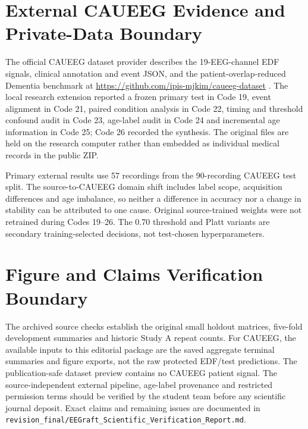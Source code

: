 \section{External CAUEEG Evidence and Private-Data Boundary}
The official CAUEEG dataset provider describes the 19-EEG-channel EDF signals, clinical annotation and event JSON, and the patient-overlap-reduced Dementia benchmark at \url{https://github.com/ipis-mjkim/caueeg-dataset} \cite{kim2023caueeg,caueegofficial}. The local research extension reported a frozen primary test in Code 19, event alignment in Code 21, paired condition analysis in Code 22, timing and threshold confound audit in Code 23, age-label audit in Code 24 and incremental age information in Code 25; Code 26 recorded the synthesis. The original files are held on the research computer rather than embedded as individual medical records in the public ZIP.

Primary external results use 57 recordings from the 90-recording CAUEEG test split. The source-to-CAUEEG domain shift includes label scope, acquisition differences and age imbalance, so neither a difference in accuracy nor a change in stability can be attributed to one cause. Original source-trained weights were not retrained during Codes 19--26. The 0.70 threshold and Platt variants are secondary training-selected decisions, not test-chosen hyperparameters.

\section{Figure and Claims Verification Boundary}
The archived source checks establish the original small holdout matrices, five-fold development summaries and historic Study A repeat counts. For CAUEEG, the available inputs to this editorial package are the saved aggregate terminal summaries and figure exports, not the raw protected EDF/test predictions. The publication-safe dataset preview contains no CAUEEG patient signal. The source-independent external pipeline, age-label provenance and restricted permission terms should be verified by the student team before any scientific journal deposit. Exact claims and remaining issues are documented in \texttt{revision\_final/}\mbox{\texttt{EEGraft\_Scientific\_Verification\_Report.md}}.
